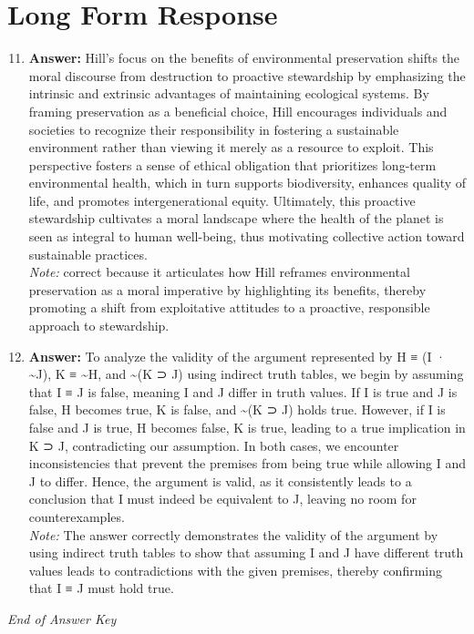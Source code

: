 \documentclass[12pt]{article}
\begin{document}
\section*{Long Form Response}
\begin{enumerate}[label=\arabic*.]
\setcounter{enumi}{10}
\item \textbf{Answer:} Hill's focus on the benefits of environmental preservation shifts the moral discourse from destruction to proactive stewardship by emphasizing the intrinsic and extrinsic advantages of maintaining ecological systems. By framing preservation as a beneficial choice, Hill encourages individuals and societies to recognize their responsibility in fostering a sustainable environment rather than viewing it merely as a resource to exploit. This perspective fosters a sense of ethical obligation that prioritizes long-term environmental health, which in turn supports biodiversity, enhances quality of life, and promotes intergenerational equity. Ultimately, this proactive stewardship cultivates a moral landscape where the health of the planet is seen as integral to human well-being, thus motivating collective action toward sustainable practices.
\\ \textit{Note:} correct because it articulates how Hill reframes environmental preservation as a moral imperative by highlighting its benefits, thereby promoting a shift from exploitative attitudes to a proactive, responsible approach to stewardship.
\item \textbf{Answer:} To analyze the validity of the argument represented by H ≡ (I · \textasciitilde{}J), K ≡ \textasciitilde{}H, and \textasciitilde{}(K ⊃ J) using indirect truth tables, we begin by assuming that I ≡ J is false, meaning I and J differ in truth values. If I is true and J is false, H becomes true, K is false, and \textasciitilde{}(K ⊃ J) holds true. However, if I is false and J is true, H becomes false, K is true, leading to a true implication in K ⊃ J, contradicting our assumption. In both cases, we encounter inconsistencies that prevent the premises from being true while allowing I and J to differ. Hence, the argument is valid, as it consistently leads to a conclusion that I must indeed be equivalent to J, leaving no room for counterexamples.
\\ \textit{Note:} The answer correctly demonstrates the validity of the argument by using indirect truth tables to show that assuming I and J have different truth values leads to contradictions with the given premises, thereby confirming that I ≡ J must hold true.
\end{enumerate}

\vfill
\noindent\textit{End of Answer Key}
\end{document}
